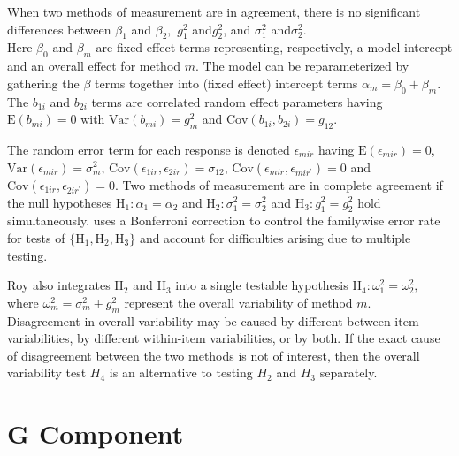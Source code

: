 \documentclass[12pt, a4paper]{report}
\theoremstyle{plain}
\theoremstyle{definition}
\theoremstyle{remark}
\begin{document}
When two methods of measurement are in agreement, there is no significant differences between $\beta_1$ and $\beta_2,$ $g^2_1 $ and$ g^2_2$, and $\sigma^2_1 $ and$ \sigma^2_2$.\\
\bigskip
Here $\beta_0$ and $\beta_m$ are fixed-effect terms representing, respectively, a model intercept and an overall effect for method $m.$ The model can be reparameterized by gathering the $\beta$ terms together into (fixed effect) intercept terms $\alpha_m=\beta_0+\beta_m.$ The $b_{1i}$ and $b_{2i}$ terms are correlated random effect parameters having $\mathrm{E}(b_{mi})=0$ with $\mathrm{Var}(b_{mi})=g^2_m$ and $\mathrm{Cov}(b_{1i}, b_{2 i})=g_{12}.$ \\
\bigskip

The random error term for each response is denoted $\epsilon_{mir}$ having $\mathrm{E}(\epsilon_{mir})=0$, $\mathrm{Var}(\epsilon_{mir})=\sigma^2_m$, $\mathrm{Cov}(\epsilon_{1ir}, \epsilon_{2 ir})=\sigma_{12}$, $\mathrm{Cov}(\epsilon_{mir}, \epsilon_{mir^\prime})= 0$ and $\mathrm{Cov}(\epsilon_{1ir}, \epsilon_{2 ir^\prime})= 0.$ Two methods of measurement are in complete agreement if the null hypotheses $\mathrm{H}_1\colon \alpha_1 = \alpha_2$ and $\mathrm{H}_2\colon \sigma^2_1 = \sigma^2_2 $ and $\mathrm{H}_3\colon g^2_1= g^2_2$ hold simultaneously. \citet{roy} uses a Bonferroni correction to control the familywise error rate for tests of $\{\mathrm{H}_1, \mathrm{H}_2, \mathrm{H}_3\}$ and account for difficulties arising due to multiple testing. \\
\bigskip

Roy also integrates $\mathrm{H}_2$ and $\mathrm{H}_3$ into a single testable hypothesis $\mathrm{H}_4\colon \omega^2_1=\omega^2_2,$ where $\omega^2_m = \sigma^2_m + g^2_m$ represent the overall variability of method $m.$ \\
\bigskip
Disagreement in overall variability may be caused by different between-item variabilities, by different within-item variabilities, or by both.  If the exact cause of disagreement between the two methods is not of interest, then the overall variability test $H_4$ is an alternative to testing $H_2$ and $H_3$ separately.


\section{G Component}

\end{document}
